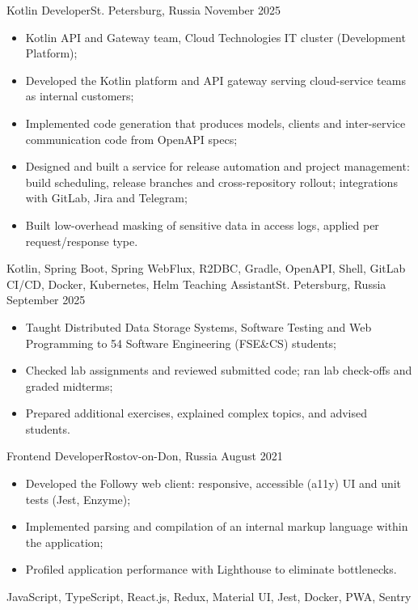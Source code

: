 
\begin{experiences}
   {Kotlin Developer}{}{St. Petersburg, Russia}
    {November 2025}  {
                     \begin{itemize}
                     \item Kotlin API and Gateway team, Cloud Technologies IT cluster (Development Platform);
                     \item Developed the Kotlin platform and API gateway serving cloud-service teams as internal customers;
                     \item Implemented code generation that produces models, clients and inter-service communication code from OpenAPI specs;
                     \item Designed and built a service for release automation and project management: build scheduling, release branches and cross-repository rollout; integrations with GitLab, Jira and Telegram;
                     \item Built low-overhead masking of sensitive data in access logs, applied per request/response type.
                     \end{itemize}
                  }
                  {Kotlin, Spring Boot, Spring WebFlux, R2DBC, Gradle, OpenAPI, Shell, GitLab CI/CD, Docker, Kubernetes, Helm}
  \emptySeparator
   {Teaching Assistant}{}{St. Petersburg, Russia}
    {September 2025}  {
                     \begin{itemize}
                     \item Taught Distributed Data Storage Systems, Software Testing and Web Programming to 54 Software Engineering (FSE\&CS) students;
                     \item Checked lab assignments and reviewed submitted code; ran lab check-offs and graded midterms;
                     \item Prepared additional exercises, explained complex topics, and advised students.
                     \end{itemize}
                  }
                  {}
  \emptySeparator
   {Frontend Developer}{}{Rostov-on-Don, Russia}
    {August 2021}  {
                     \begin{itemize}
                     \item Developed the Followy web client: responsive, accessible (a11y) UI and unit tests (Jest, Enzyme);
                     \item Implemented parsing and compilation of an internal markup language within the application;
                     \item Profiled application performance with Lighthouse to eliminate bottlenecks.
                     \end{itemize}
                  }
                  {JavaScript, TypeScript, React.js, Redux, Material UI, Jest, Docker, PWA, Sentry}
\end{experiences}

